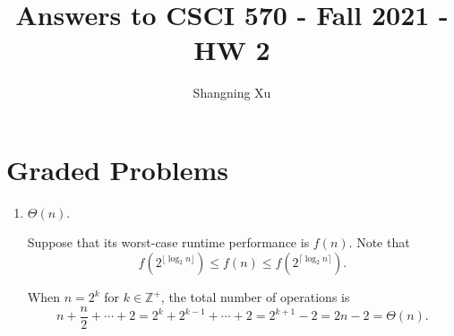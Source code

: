 \documentclass{article}
\title{Answers to CSCI 570 - Fall 2021 - HW 2}
\author{Shangning Xu}
\begin{document}
\maketitle

\section{Graded Problems}

\begin{enumerate}
    \item $\Theta(n)$.
    
    Suppose that its worst-case runtime performance is $f(n)$. Note that
    \[
        f(2^{\lfloor\log_2 n\rfloor}) \le f(n) \le f(2^{\lceil\log_2 n\rceil}).
    \]
    
    When $n = 2^k$ for $k \in \mathbb{Z}^+$, the total number of operations is
    \[
        n + \frac{n}{2} + \cdots + 2 = 2^k + 2^{k - 1} + \cdots + 2 = 2^{k + 1} - 2 = 2n - 2 = \Theta(n).
    \]
    

\end{enumerate}
\end{document}
